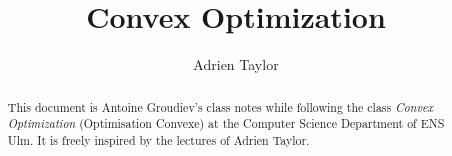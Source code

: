 \documentclass[toc, titlepaged]{../cs-classes/cs-classes}
\title{Convex Optimization}
\author{Adrien Taylor}
\begin{document}
\begin{abstract}
    This document is Antoine Groudiev's class notes while following the class \emph{Convex Optimization} (Optimisation Convexe) at the Computer Science Department of ENS Ulm. It is freely inspired by the lectures of Adrien Taylor.
\end{abstract}






\end{document}
